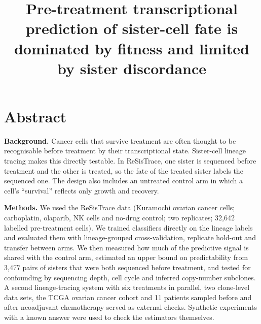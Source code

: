 \documentclass[11pt,a4paper]{article}
\date{}
\begin{document}
\title{Pre-treatment transcriptional prediction of sister-cell fate is dominated by fitness and limited by sister discordance}
\maketitle

\section*{Abstract}

\textbf{Background.} Cancer cells that survive treatment are often thought to be recognisable before treatment by their transcriptional state. Sister-cell lineage tracing makes this directly testable. In ReSisTrace, one sister is sequenced before treatment and the other is treated, so the fate of the treated sister labels the sequenced one. The design also includes an untreated control arm in which a cell's ``survival'' reflects only growth and recovery.

\textbf{Methods.} We used the ReSisTrace data (Kuramochi ovarian cancer cells; carboplatin, olaparib, NK cells and no-drug control; two replicates; 32,642 labelled pre-treatment cells). We trained classifiers directly on the lineage labels and evaluated them with lineage-grouped cross-validation, replicate hold-out and transfer between arms. We then measured how much of the predictive signal is shared with the control arm, estimated an upper bound on predictability from 3,477 pairs of sisters that were both sequenced before treatment, and tested for confounding by sequencing depth, cell cycle and inferred copy-number subclones. A second lineage-tracing system with six treatments in parallel, two clone-level data sets, the TCGA ovarian cancer cohort and 11 patients sampled before and after neoadjuvant chemotherapy served as external checks. Synthetic experiments with a known answer were used to check the estimators themselves.
\end{document}
